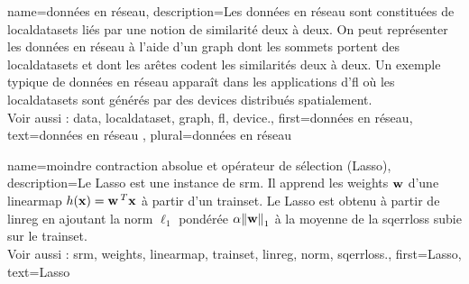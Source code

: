 {name={données en réseau},
	description={Les données en réseau sont constituées de \glspl{localdataset} 
		liés par une notion de similarité deux à deux. On peut représenter les données en réseau 
		à l’aide d’un \gls{graph} dont les sommets portent des \glspl{localdataset} et dont les arêtes 
		codent les similarités deux à deux. Un exemple typique de données en réseau apparaît dans les applications d'\gls{fl} 
		où les \glspl{localdataset} sont générés par des \glspl{device} distribués spatialement.
		\\
		Voir aussi : \gls{data}, \gls{localdataset}, \gls{graph}, \gls{fl}, \gls{device}.}, 
	first={données en réseau},
	text={données en réseau}  , plural={données en réseau}
}

{name={moindre contraction absolue et opérateur de sélection (Lasso)}, 
	description={Le Lasso est une 
		instance de \gls{srm}. Il apprend les \gls{weights} ${\bf w}$ d'une \gls{linearmap} 
		$h({\bf x}) = {\bf w}\,^{T} {\bf x}$ à partir d'un \gls{trainset}. 
		Le Lasso est obtenu à partir de \gls{linreg} en ajoutant la \gls{norm} $\ell_{1}$ 
		pondérée $\regparam \normgeneric{\weights}{1}$ à la moyenne de la \gls{sqerrloss} subie sur le \gls{trainset}. 
		\\
		Voir aussi : \gls{srm}, \gls{weights}, \gls{linearmap}, \gls{trainset}, \gls{linreg}, \gls{norm}, \gls{sqerrloss}.},
	first={Lasso},
	text={Lasso} 
}

